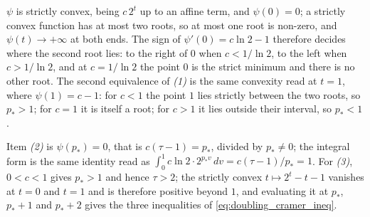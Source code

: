$\psi$ is strictly convex, being $c\,2^{t}$ up to an affine term, and $\psi(0)=0$; a strictly
convex function has at most two roots, so at most one root is non-zero, and
$\psi(t)\rightarrow+\infty$ at both ends. The sign of $\psi'(0)=c\ln2-1$ therefore decides
where the second root lies: to the right of $0$ when $c<1/\ln2$, to the left when
$c>1/\ln2$, and at $c=1/\ln2$ the point $0$ is the strict minimum and there is no other root.
The second equivalence of \emph{(1)} is the same convexity read at $t=1$, where
$\psi(1)=c-1$: for $c<1$ the point $1$ lies strictly between the two roots, so $p_*>1$; for
$c=1$ it is itself a root; for $c>1$ it lies outside their interval, so $p_*<1$.

Item \emph{(2)} is $\psi(p_*)=0$, that is $c(\tau-1)=p_*$, divided by $p_*\neq0$; the
integral form is the same identity read as
$\int_0^1c\ln2\cdot2^{p_*v}\,dv=c(\tau-1)/p_*=1$. For \emph{(3)}, $0<c<1$ gives $p_*>1$ and
hence $\tau>2$; the strictly convex $t\mapsto2^{t}-t-1$ vanishes at $t=0$ and $t=1$ and is
therefore positive beyond $1$, and evaluating it at $p_*$, $p_*+1$ and $p_*+2$ gives the three
inequalities of \eqref{eq:doubling_cramer_ineq}.
